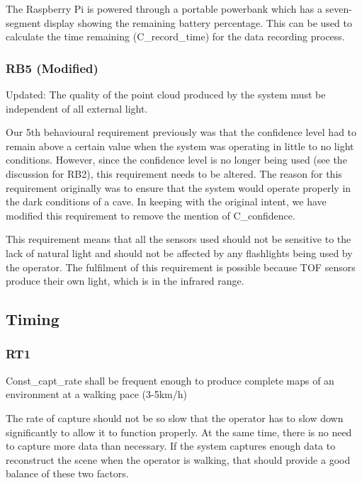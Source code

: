 \documentclass[11pt]{article}
\begin{document}
	The Raspberry Pi is powered through a portable powerbank which has a seven-segment display showing the remaining battery percentage. This can be used to calculate the time remaining (C\_record\_time) for the data recording process.
	
	\subsubsection{RB5 (Modified)} 
	
	\begin{exampleblock}[orange]
		Updated: The quality of the point cloud produced by the system must be independent of all external light.
	\end{exampleblock}
	
	Our 5th behavioural requirement previously was that the confidence level had to remain above a certain value when the system was operating in little to no light conditions. However, since the confidence level is no longer being used (see the discussion for RB2), this requirement needs to be altered. The reason for this requirement originally was to ensure that the system would operate properly in the dark conditions of a cave. In keeping with the original intent, we have modified this requirement to remove the mention of C\_confidence. 
	
	This requirement means that all the sensors used should not be sensitive to the lack of natural light and should not be affected by any flashlights being used by the operator. The fulfilment of this requirement is possible because TOF sensors produce their own light, which is in the infrared range. 
	
	
	\subsection{Timing}
	
	\subsubsection{RT1}
	
	\begin{exampleblock}
		Const\_capt\_rate shall be frequent enough to produce complete maps of an environment at a walking pace (3-5km/h)
	\end{exampleblock}
	
	The rate of capture should not be so slow that the operator has to slow down significantly to allow it to function properly. At the same time, there is no need 
	to capture more data than necessary. If the system captures enough data to reconstruct the scene when the operator is walking, that should provide a good balance 
	of these two factors.
	
\end{document}
